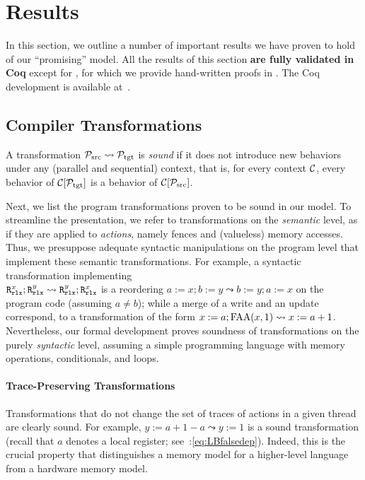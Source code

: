 \section{Results}
\label{sec:results}

In this section, we outline a number of important results we have
proven to hold of our ``promising'' model.
%
%
All the results of this section \textbf{are fully validated in Coq} except
for %
, for which we provide hand-written proofs in .
The {Coq} development is available at~\cite{kang-phd-thesis-web}.

\subsection{Compiler Transformations}
\label{sec:transformations}

A transformation $\mathcal{P}_\text{src} \leadsto \mathcal{P}_\text{tgt}$ is \emph{sound} 
if it does not introduce new behaviors under any (parallel and sequential) context, that is, 
for every context ${\cal C}$,
every behavior of ${\cal C}[\mathcal{P}_\text{tgt}]$ is a behavior of ${\cal C}[\mathcal{P}_\text{src}]$.

Next, we list the program transformations proven to be sound in our model.
To streamline the presentation, we refer to transformations on the \emph{semantic} level, 
as if they are applied to \emph{actions}, namely fences and (valueless) memory accesses.
Thus, we presuppose adequate syntactic manipulations on the program level
that implement these semantic transformations.
For example, a syntactic transformation implementing \\
${\texttt{R}^x_{\texttt{rlx}};\texttt{R}^y_{\texttt{rlx}} \leadsto \texttt{R}^y_{\texttt{rlx}};\texttt{R}^x_{\texttt{rlx}}}$
is a reordering ${a:=x; b:=y \leadsto b:=y; a:=x}$
on the program code (assuming $a \neq b$);
while a merge of a write and an update correspond, \eg  to a transformation
of the form $x:=a;\textrm{FAA}({x,1})  \leadsto  x:=a+1$.
Nevertheless, our formal development
proves soundness of transformations on the purely \emph{syntactic} level, assuming a simple programming language with memory operations, conditionals, and loops.



\paragraph{Trace-Preserving Transformations}
Transformations that do not change the set of traces of actions in a given thread are clearly sound.
For example, $y:=a+1-a \leadsto y:=1$ is a sound transformation (recall that $a$ denotes a local register; see~:\ref{eq:LBfalsedep}).
Indeed, this is the crucial property that distinguishes a memory model for a higher-level language from
a hardware memory model.

